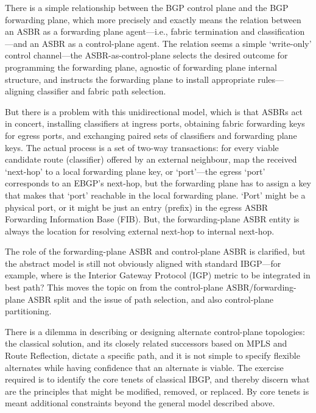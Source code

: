 There is a simple relationship between the BGP control plane and the BGP forwarding plane, which more precisely and exactly means the relation between an ASBR as a forwarding plane agent—i.e., fabric termination and classification—and an ASBR as a control-plane agent. The relation seems a simple `write-only' control channel—the ASBR-as-control-plane selects the desired outcome for programming the forwarding plane, agnostic of forwarding plane internal structure, and instructs the forwarding plane to install appropriate rules—aligning classifier and fabric path selection.

But there is a problem with this unidirectional model, which is that ASBRs act in concert, installing classifiers at ingress ports, obtaining fabric forwarding keys for egress ports, and exchanging paired sets of classifiers and forwarding plane keys. The actual process is a set of two-way transactions: for every viable candidate route (classifier) offered by an external neighbour, map the received `next-hop' to a local forwarding plane key, or `port'—the egress `port' corresponds to an EBGP's next-hop, but the forwarding plane has to assign a key that makes that `port' reachable in the local forwarding plane. `Port' might be a physical port, or it might be just an entry (prefix) in the egress ASBR Forwarding Information Base (FIB). But, the forwarding-plane ASBR entity is always the location for resolving external next-hop to internal next-hop.


The role of the forwarding-plane ASBR and control-plane ASBR is clarified, but the abstract model is still not obviously aligned with standard IBGP—for example, where is the Interior Gateway Protocol (IGP) metric to be integrated in best path? This moves the topic on from the control-plane ASBR/forwarding-plane ASBR split and the issue of path selection, and also control-plane partitioning.

There is a dilemma in describing or designing alternate control-plane topologies: the classical solution, and its closely related successors based on MPLS and Route Reflection, dictate a specific path, and it is not simple to specify flexible alternates while having confidence that an alternate is viable. The exercise required is to identify the core tenets of classical IBGP, and thereby discern what are the principles that might be modified, removed, or replaced. By core tenets is meant additional constraints beyond the general model described above.

